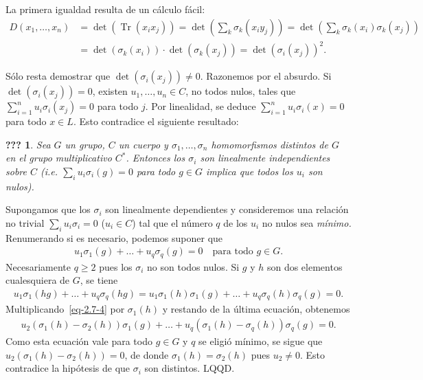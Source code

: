 \documentclass[bibtotoc,leqno,spanish]{amsbook}
\newcommand{\QED}{LQQD.}
\DeclareMathOperator{\Tr}{Tr}
\numberwithin{equation}{section}
\theoremstyle{note}
\theoremstyle{note}
\newcommand{\namedname}{???}
\newtheorem*{namedthm}{\namedname}
\newenvironment{named}[1]%
	{\renewcommand{\namedname}{#1}%
	\begin{namedthm}}%
	{\end{namedthm}}
\theoremstyle{rem}
\numberwithin{theorem}{section}
\numberwithin{proposition}{section}
\numberwithin{definition}{section}
\numberwithin{lemma}{section}
\numberwithin{corollary}{section}
\numberwithin{example}{section}
\numberwithin{footnote}{section}%
\begin{document}
La primera igualdad resulta de un c\'alculo f\'acil:
\begin{align*}
D(x_{1},\dots,x_{n}) &= \det(\Tr(x_{i}x_{j})) = \det\left(\sum_{k}\sigma_{k}(x_{i}y_{j})\right)
= \det\left(\sum_{k}\sigma_{k}(x_{i})\sigma_{k}(x_{j})\right)\\
&= \det(\sigma_{k}(x_{i}))\cdot\det(\sigma_{k}(x_{j})) = \det(\sigma_{i}(x_{j}))^{2}.
\end{align*}

S\'olo resta demostrar que $\det(\sigma_{i}(x_{j}))\neq 0$. Razonemos por el absurdo. Si $\det(\sigma_{i}(x_{j})) = 0$,
existen $u_{1},\dots,u_{n}\in C$, no todos nulos, tales que $\sum_{i=1}^{n}u_{i}\sigma_{i}(x_{j}) = 0$ para todo $j$.
Por linealidad, se deduce $\sum_{i=1}^{n}u_{i}\sigma_{i}(x) = 0$ para todo $x\in L$. Esto contradice el siguiente
resultado:

\begin{named}{Lema de Dedekind}
Sea $G$ un grupo, $C$ un cuerpo y $\sigma_{1},\dots,\sigma_{n}$ homomorfismos distintos de $G$ en el grupo
multiplicativo $C^{*}$. Entonces los $\sigma_{i}$ son linealmente independientes sobre $C$ (i.e.
$\sum_{i}u_{i}\sigma_{i}(g) = 0$ para todo $g\in G$ implica que todos los $u_{i}$ son nulos{\upshape).}
\end{named}

Supongamos que los $\sigma_{i}$ son linealmente dependientes y consideremos una relaci\'on no trivial
$\sum_{i}u_{i}\sigma_{i} = 0$ ($u_{i}\in C$) tal que el n\'umero $q$ de los $u_{i}$ no nulos sea {\em
m\'inimo.} Renumerando si es necesario, podemos suponer que
\begin{gather}\label{eq-2.7-4}
u_{1}\sigma_{1}(g) +\dots+u_{q}\sigma_{q}(g) = 0\quad\text{para todo $g\in G$}.
\end{gather}
Necesariamente $q\geq 2$ pues los $\sigma_{i}$ no son todos nulos. Si $g$ y $h$ son dos elementos
cualesquiera de $G$, se tiene
\begin{gather*}
u_{1}\sigma_{1}(hg) + \dots + u_{q}\sigma_{q}(hg) = u_{1}\sigma_{1}(h)\sigma_{1}(g)+\dots+u_{q}\sigma_{q}(h)\sigma_{q}(g) = 0.
\end{gather*}
Multiplicando~\eqref{eq-2.7-4} por $\sigma_{1}(h)$ y restando de la \'ultima ecuaci\'on, obtenemos
\begin{gather*}
u_{2}(\sigma_{1}(h)-\sigma_{2}(h))\sigma_{1}(g)+\dots+u_{q}(\sigma_{1}(h)-\sigma_{q}(h))\sigma_{q}(g) = 0.
\end{gather*}
Como esta ecuaci\'on vale para todo $g\in G$ y $q$ se eligi\'o m\'inimo, se sigue que
$u_{2}(\sigma_{1}(h)-\sigma_{2}(h)) = 0$, de donde $\sigma_{1}(h) = \sigma_{2}(h)$ pues $u_{2}\neq 0$.
Esto contradice la hip\'otesis de que $\sigma_{i}$ son distintos. \QED
\end{document}
